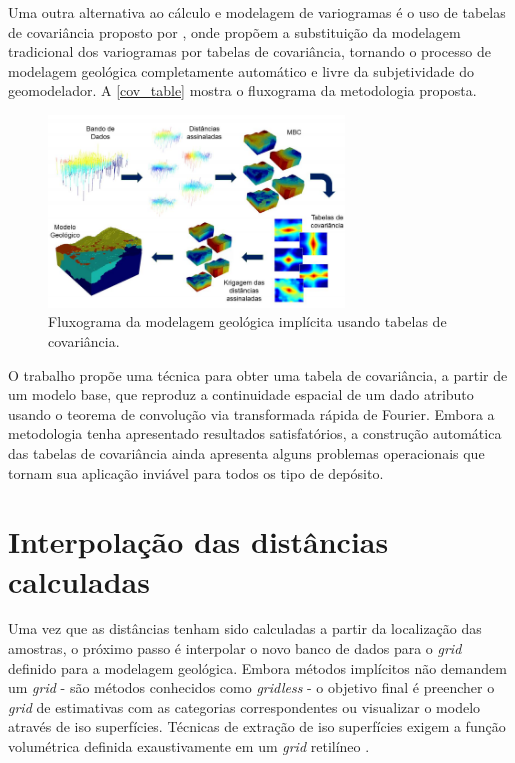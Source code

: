 Uma outra alternativa ao cálculo e modelagem de variogramas é o uso de tabelas de covariância proposto por , onde propõem a substituição da modelagem tradicional dos variogramas por tabelas de covariância, tornando o processo de modelagem geológica completamente automático e livre da subjetividade do geomodelador. A \autoref{cov_table} mostra o fluxograma da metodologia proposta.

\begin{figure}[H]
	\caption{\label{cov_table}Fluxograma da modelagem geológica implícita usando tabelas de covariância.}
	\begin{center}
		\includegraphics[width=0.7\textwidth]{capitulo_2/cov_table.png}
	\end{center}
\end{figure}

O trabalho propõe uma técnica para obter uma tabela de covariância, a partir de um modelo base, que reproduz a continuidade espacial de um dado atributo usando o teorema de convolução via transformada rápida de Fourier. Embora a metodologia tenha apresentado resultados satisfatórios, a construção automática das tabelas de covariância ainda apresenta alguns problemas operacionais que tornam sua aplicação inviável para todos os tipo de depósito.

\section{Interpolação das distâncias calculadas}

Uma vez que as distâncias tenham sido calculadas a partir da localização das amostras, o próximo passo é interpolar o novo banco de dados para o \textit{grid} definido para a modelagem geológica. Embora métodos implícitos não demandem um \textit{grid} - são métodos conhecidos como \textit{gridless} - o objetivo final é preencher o \textit{grid} de estimativas com as categorias correspondentes ou visualizar o modelo através de iso superfícies. Técnicas de extração de iso superfícies exigem a função volumétrica definida exaustivamente em um \textit{grid} retilíneo \cite{martin2017implicitmodeling}.

